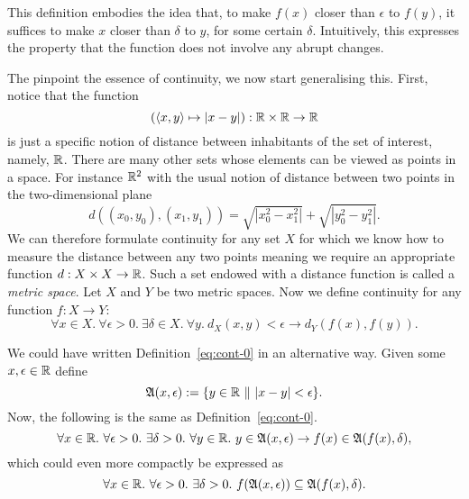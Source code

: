 This definition embodies the idea that, to make $f(x)$ closer than $\epsilon$ to $f(y)$, it
suffices to make $x$ closer than $\delta$ to $y$, for some certain $\delta$. Intuitively, this
expresses the property that the function does not involve any abrupt changes.

The pinpoint the essence of continuity, we now start generalising this. First, notice that
the function
\begin{equation*}
  (\langle x, y \rangle \mapsto | x - y |) : \mathbb{R}{} \times \mathbb{R}{} \rightarrow \mathbb{R}{}
\end{equation*}
is just a specific notion of distance between inhabitants of the set of interest, namely,
$\mathbb{R}{}$. There are many other sets whose elements can be viewed as points in a space.
For instance $\mathbb{R}{}^2$ with the usual notion of distance between two points in the
two-dimensional plane
\begin{equation*}
  d((x_0, y_0) , (x_1 , y_1)) = \sqrt{| x_0^2 - x_1^2 |} + \sqrt{| y_0^2 - y_1^2 |}.
\end{equation*}
We can therefore formulate continuity for any set $X$ for which we know how to measure the
distance between any two points meaning we require an appropriate function $d : X \times
X \rightarrow \mathbb{R}{}$. Such a set endowed with a distance function is called a
\emph{metric space}. Let $X$ and $Y$ be two metric spaces. Now we define continuity for
any function $f : X \rightarrow Y$:
\begin{equation*}
  \forall x \in X.~ \forall \epsilon > 0.~ \exists \delta \in X.~ \forall y.~ d_X(x, y) < \epsilon \rightarrow d_Y(f(x), f(y)).
\end{equation*}

We could have written Definition~\ref{eq:cont-0} in an alternative way. Given some
$x, \epsilon \in \mathbb{R}{}$ define
\begin{equation*}
  \mathfrak{A}(x, \epsilon) := \{ y \in \mathbb{R}{}~\|~| x - y | < \epsilon \}.
\end{equation*}
Now, the following is the same as Definition~\ref{eq:cont-0}.
\begin{equation*}
  \forall x \in \mathbb{R}{}.~ \forall \epsilon > 0.~ \exists \delta > 0.~ \forall y \in \mathbb{R}{}.~
    y \in \mathfrak{A}(x, \epsilon) \rightarrow f(x) \in \mathfrak{A}(f(x), \delta),
\end{equation*}
which could even more compactly be expressed as
\begin{equation*}\label{eq:cont-5}
  \forall x \in \mathbb{R}{}.~ \forall \epsilon > 0.~ \exists \delta > 0.~ f(\mathfrak{A}(x, \epsilon)) \subseteq \mathfrak{A}(f(x), \delta).
\end{equation*}

